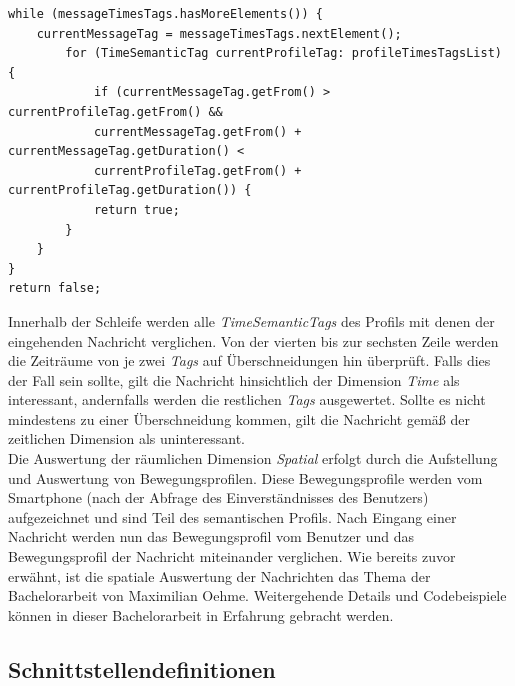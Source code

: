 \begin{lstlisting}
while (messageTimesTags.hasMoreElements()) {
	currentMessageTag = messageTimesTags.nextElement();
		for (TimeSemanticTag currentProfileTag: profileTimesTagsList) {
			if (currentMessageTag.getFrom() > currentProfileTag.getFrom() &&
			currentMessageTag.getFrom() + currentMessageTag.getDuration() <
			currentProfileTag.getFrom() + currentProfileTag.getDuration()) {
			return true;
		}
	}
}
return false;
\end{lstlisting}
Innerhalb der Schleife werden alle \textit{TimeSemanticTags} des Profils mit denen der eingehenden Nachricht verglichen. Von der vierten bis zur sechsten Zeile werden die Zeiträume von je zwei \textit{Tags} auf Überschneidungen hin überprüft. Falls dies der Fall sein sollte, gilt die Nachricht hinsichtlich der Dimension \textit{Time} als interessant, andernfalls werden die restlichen \textit{Tags} ausgewertet. Sollte es nicht mindestens zu einer Überschneidung kommen, gilt die Nachricht gemäß der zeitlichen Dimension als uninteressant.
\\Die Auswertung der räumlichen Dimension \textit{Spatial} erfolgt durch die Aufstellung und Auswertung von Bewegungsprofilen. Diese Bewegungsprofile werden vom Smartphone (nach der Abfrage des Einverständnisses des Benutzers) aufgezeichnet und sind Teil des semantischen Profils. Nach Eingang einer Nachricht werden nun das Bewegungsprofil vom Benutzer und das Bewegungsprofil der Nachricht miteinander verglichen. Wie bereits zuvor erwähnt, ist die spatiale Auswertung der Nachrichten das Thema der Bachelorarbeit von Maximilian Oehme. Weitergehende Details und Codebeispiele können in dieser Bachelorarbeit in Erfahrung gebracht werden.

\subsection{Schnittstellendefinitionen}\label{ch:filterinterfaces}


